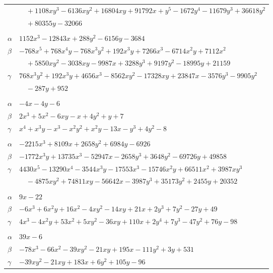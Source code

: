 \documentclass[11pt]{article}
\begin{document}
\begin{longtable}{@{}ll@{}}
 & $\quad +1108xy^{3}-6136xy^{2}+16804xy+91792x+y^{5}-1672y^{4}-11679y^{3}+36618y^{2}$\\
 & $\quad +80355y-32066$\\
\addlinespace[3pt]
\multicolumn{2}{@{}l}{$\{i,j\}=\{8,29\}$, $k_{ij}=3\cdot 7^{2}\cdot 13^{2}$}\\
$\alpha$ & $1152x^{3}-12843x+288y^{2}-6156y-3684$\\
$\beta$ & $-768x^{5}+768x^{4}y-768x^{3}y^{2}+192x^{3}y+7266x^{3}-6714x^{2}y+7112x^{2}$\\
 & $\quad +5850xy^{2}-3038xy-9987x+3288y^{3}+9197y^{2}-18995y+21159$\\
$\gamma$ & $768x^{3}y^{2}+192x^{3}y+4656x^{3}-8562xy^{2}-17328xy+23847x-3576y^{3}-9905y^{2}$\\
 & $\quad -287y+952$\\
\addlinespace[3pt]
\multicolumn{2}{@{}l}{$\{i,j\}=\{8,30\}$, $k_{ij}=3\cdot 7$}\\
$\alpha$ & $-4x-4y-6$\\
$\beta$ & $2x^{3}+5x^{2}-6xy-x+4y^{2}+y+7$\\
$\gamma$ & $x^{4}+x^{3}y-x^{3}-x^{2}y^{2}+x^{2}y-13x-y^{3}+4y^{2}-8$\\
\addlinespace[3pt]
\multicolumn{2}{@{}l}{$\{i,j\}=\{8,31\}$, $k_{ij}=2^{4}\cdot 3\cdot 7\cdot 13^{2}$}\\
$\alpha$ & $-2215x^{3}+8109x+2658y^{2}+6984y-6926$\\
$\beta$ & $-1772x^{3}y+13735x^{3}-52947x-2658y^{3}+3648y^{2}-69726y+49858$\\
$\gamma$ & $4430x^{5}-13290x^{4}-3544x^{3}y-17553x^{3}-15746x^{2}y+66511x^{2}+3987xy^{3}$\\
 & $\quad -4875xy^{2}+74811xy-56642x-3987y^{3}+35173y^{2}+2455y+20352$\\
\addlinespace[3pt]
\multicolumn{2}{@{}l}{$\{i,j\}=\{8,89\}$, $k_{ij}=13^{2}$}\\
$\alpha$ & $9x-22$\\
$\beta$ & $-6x^{3}+6x^{2}y+16x^{2}-4xy^{2}-14xy+21x+2y^{3}+7y^{2}-27y+49$\\
$\gamma$ & $4x^{3}-4x^{2}y+53x^{2}+5xy^{2}-36xy+110x+2y^{4}+7y^{3}-47y^{2}+76y-98$\\
\addlinespace[3pt]
\multicolumn{2}{@{}l}{$\{i,j\}=\{9,18\}$, $k_{ij}=3^{2}\cdot 7^{2}$}\\
$\alpha$ & $39x-6$\\
$\beta$ & $-78x^{3}-66x^{2}-39xy^{2}-21xy+195x-111y^{2}+3y+531$\\
$\gamma$ & $-39xy^{2}-21xy+183x+6y^{2}+105y-96$\\

\end{longtable}
\end{document}
